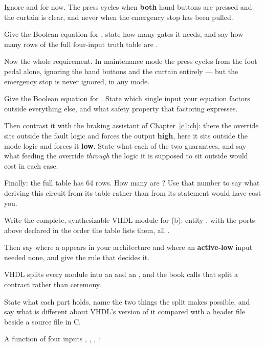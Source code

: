  Ignore  and  for now. The press cycles when \textbf{both} hand
buttons are pressed and the curtain is clear, and never when the emergency stop has been pulled.

Give the Boolean equation for , state how many gates it needs, and say how many rows of
the full four-input truth table are . 

 Now the whole requirement. In maintenance mode the press cycles from the foot pedal alone,
ignoring the hand buttons and the curtain entirely --- but the emergency stop is never ignored, in
any mode.

Give the Boolean equation for . State which single input your equation factors outside
everything else, and what safety property that factoring expresses.

Then contrast it with the braking assistant of Chapter~\ref{c1:ch}: there the override sits outside
the fault logic and forces the output \textbf{high}, here it sits outside the mode logic and forces
it \textbf{low}. State what each of the two guarantees, and say what feeding the override
\emph{through} the logic it is supposed to sit outside would cost in each case.

Finally: the full table has 64 rows. How many are ? Use that number to say what deriving
this circuit from its table rather than from its statement would have cost you. 

 Write the complete, synthesizable VHDL module for (b): entity , with
the ports above declared in the order the table lists them, all .

Then say where a  appears in your architecture and where an \textbf{active-low} input
needed none, and give the rule that decides it. 

 VHDL splits every module into an  and an , and the book
calls that split a contract rather than ceremony.

State what each part holds, name the two things the split makes possible, and say what is
different about VHDL's version of it compared with a header file beside a source file in C.

\label{exb:q:2}

 A function  of four inputs , , , :

